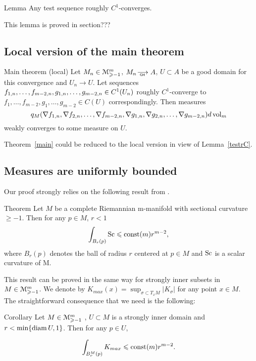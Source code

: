 \documentclass[a4paper,10pt]{article}
\begin{document}
 
 
\begin{thm}{Lemma}\label{testrC}
	Any test sequence roughly
	$C^1$-converges.
	
\end{thm}

This lemma is proved in section???
 
 
 
 
 \subsection{Local version of the main theorem}\label{sec:loc}
 
 
\begin{thm}{Main theorem (local)}\label{mainloc}
Let   
$M_n\in\mathcal M_{\geqslant -1}^m$,
$M_n\GHto A$, 
  $U\subset A$ be a good domain for this convergence
  and $U_n\to U$.
  Let sequences $f_{1,n},\dots,f_{m-2,n},\\ g_{1,n},\dots,g_{m-2,n}\in C^1(U_n)$ 
  roughly $C^1$-converge to
   $f_1,\dots, f_{m-2}, g_1,\dots, g_{m-2}\in C(U)$ correspondingly.
Then measures 
$${q}_M(\nabla f_{1,n},\nabla f_{2,n},\dots,\nabla f_{m-2,n},
\nabla g_{1,n},\nabla g_{2,n},\dots,\nabla g_{m-2,n})d\operatorname{vol}_m$$ weakly converges to some
measure on $U$.
\end{thm}

Theorem~\ref{main} could be reduced to the local version
in view of Lemma~\ref{testrC}.


\subsection{Measures are uniformly bounded}
Our proof strongly relies on the following result from
\cite{petrunin-SC}.
\begin{thm}{Theorem}\label{scPet}
Let $M$ be a complete Riemannian m-manifold with sectional
curvature $ \ge -1$.
Then for any $p \in M$, $r<1$
$$\int_{B_r(p)} \operatorname{Sc}\leqslant \mathrm{const}(m)r^{m-2},$$
where $B_r(p)$ denotes the ball of radius $r$ centered at $p\in M$ and $\operatorname{Sc}$ is a scalar curvature
of M.
\end{thm}

This result can be proved in the same way for
strongly inner subsets in $M\in\mathcal M_{\geqslant -1}^m$.
We denote by $K_{max}(x)=\sup_{\sigma\subset T_xM} |K_\sigma|$
for any point $x\in M$.
The straightforward consequence that we need is the following:

\begin{thm}{Corollary}\label{Kbound}
Let $M\in\mathcal M_{\geqslant -1}^m$ ,
$U\subset M$ is a strongly inner domain and
 $r<\min\{\operatorname{diam} U, 1\}$.
 Then for any $p\in U$,

$$\int_{B_r^M(p)} K_{max}\leqslant \mathrm{const}(m)r^{m-2}.$$


\end{thm}
\end{document}
